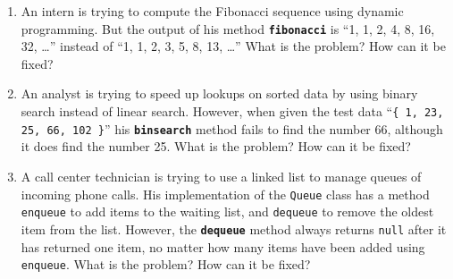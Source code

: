 \documentclass[a4paper]{article}
\begin{document}
\begin{enumerate}
\item
  An intern is trying to compute the Fibonacci sequence using dynamic programming.
  But the output of his method \textbf{\texttt{fibonacci}} is ``1, 1, 2, 4, 8, 16, 32, \ldots'' instead of ``1, 1, 2, 3, 5, 8, 13, \ldots''
  What is the problem?
  How can it be fixed?
\item
  An analyst is trying to speed up lookups on sorted data by using binary search instead of linear search.
  However, when given the test data ``\texttt{\{ 1, 23, 25, 66, 102 \}}'' his \textbf{\texttt{binsearch}} method fails to find the number 66, although it does find the number 25.
  What is the problem?
  How can it be fixed?
\item
  A call center technician is trying to use a linked list to manage queues of incoming phone calls.
  His implementation of the \texttt{Queue} class has a method \texttt{enqueue} to add items to the waiting list, and \texttt{dequeue} to remove the oldest item from the list.
  However, the \textbf{\texttt{dequeue}} method always returns \texttt{null} after it has returned one item, no matter how many items have been added using \texttt{\texttt{enqueue}}.
  What is the problem?
  How can it be fixed?
\end{enumerate}
\end{document}
